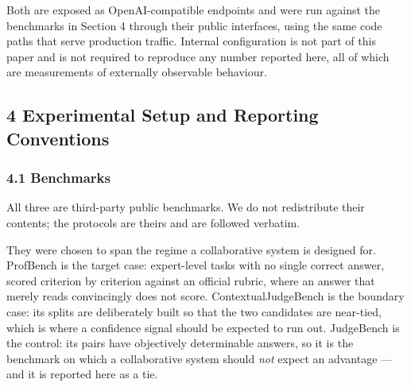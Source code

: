 \documentclass[
]{article}
\begin{document}
Both are exposed as OpenAI-compatible endpoints and were run against the benchmarks in
Section 4 through their public interfaces, using the same code paths that serve
production traffic. Internal configuration is not part of this paper and is not
required to reproduce any number reported here, all of which are measurements of
externally observable behaviour.

\subsection{4 Experimental Setup and Reporting Conventions}\label{setup}

\subsubsection{4.1 Benchmarks}\label{benchmarks}

\begin{table}[ht]
\centering
\small
\caption{Benchmarks used, all third-party and public.}\label{tab:benchmarks}
\end{table}

All three are third-party public benchmarks. We do not redistribute their contents; the
protocols are theirs and are followed verbatim.

They were chosen to span the regime a collaborative system is designed for. ProfBench is
the target case: expert-level tasks with no single correct answer, scored criterion by
criterion against an official rubric, where an answer that merely reads convincingly does
not score. ContextualJudgeBench is the boundary case: its splits are deliberately built so
that the two candidates are near-tied, which is where a confidence signal should be
expected to run out. JudgeBench is the control: its pairs have objectively determinable
answers, so it is the benchmark on which a collaborative system should \emph{not} expect an
advantage --- and it is reported here as a tie.
\end{document}
